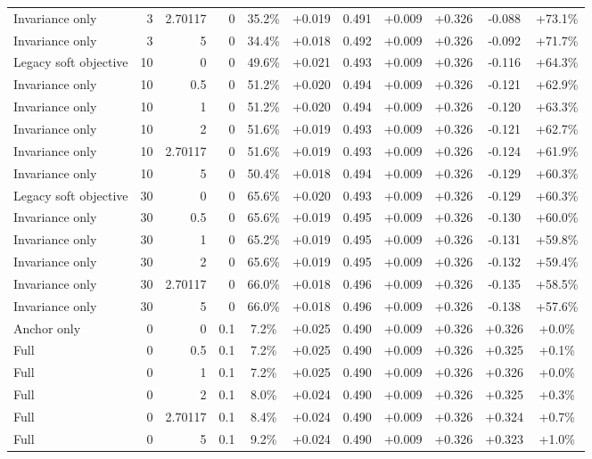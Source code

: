 \begin{table}[htbp]
\begin{tabular}{lrrrccccccc}
Invariance only & 3 & 2.70117 & 0 & 35.2\% & +0.019 & 0.491 & +0.009 & +0.326 & -0.088 & +73.1\% \\
Invariance only & 3 & 5 & 0 & 34.4\% & +0.018 & 0.492 & +0.009 & +0.326 & -0.092 & +71.7\% \\
Legacy soft objective & 10 & 0 & 0 & 49.6\% & +0.021 & 0.493 & +0.009 & +0.326 & -0.116 & +64.3\% \\
Invariance only & 10 & 0.5 & 0 & 51.2\% & +0.020 & 0.494 & +0.009 & +0.326 & -0.121 & +62.9\% \\
Invariance only & 10 & 1 & 0 & 51.2\% & +0.020 & 0.494 & +0.009 & +0.326 & -0.120 & +63.3\% \\
Invariance only & 10 & 2 & 0 & 51.6\% & +0.019 & 0.493 & +0.009 & +0.326 & -0.121 & +62.7\% \\
Invariance only & 10 & 2.70117 & 0 & 51.6\% & +0.019 & 0.493 & +0.009 & +0.326 & -0.124 & +61.9\% \\
Invariance only & 10 & 5 & 0 & 50.4\% & +0.018 & 0.494 & +0.009 & +0.326 & -0.129 & +60.3\% \\
Legacy soft objective & 30 & 0 & 0 & 65.6\% & +0.020 & 0.493 & +0.009 & +0.326 & -0.129 & +60.3\% \\
Invariance only & 30 & 0.5 & 0 & 65.6\% & +0.019 & 0.495 & +0.009 & +0.326 & -0.130 & +60.0\% \\
Invariance only & 30 & 1 & 0 & 65.2\% & +0.019 & 0.495 & +0.009 & +0.326 & -0.131 & +59.8\% \\
Invariance only & 30 & 2 & 0 & 65.6\% & +0.019 & 0.495 & +0.009 & +0.326 & -0.132 & +59.4\% \\
Invariance only & 30 & 2.70117 & 0 & 66.0\% & +0.018 & 0.496 & +0.009 & +0.326 & -0.135 & +58.5\% \\
Invariance only & 30 & 5 & 0 & 66.0\% & +0.018 & 0.496 & +0.009 & +0.326 & -0.138 & +57.6\% \\
Anchor only & 0 & 0 & 0.1 & 7.2\% & +0.025 & 0.490 & +0.009 & +0.326 & +0.326 & +0.0\% \\
Full & 0 & 0.5 & 0.1 & 7.2\% & +0.025 & 0.490 & +0.009 & +0.326 & +0.325 & +0.1\% \\
Full & 0 & 1 & 0.1 & 7.2\% & +0.025 & 0.490 & +0.009 & +0.326 & +0.326 & +0.0\% \\
Full & 0 & 2 & 0.1 & 8.0\% & +0.024 & 0.490 & +0.009 & +0.326 & +0.325 & +0.3\% \\
Full & 0 & 2.70117 & 0.1 & 8.4\% & +0.024 & 0.490 & +0.009 & +0.326 & +0.324 & +0.7\% \\
Full & 0 & 5 & 0.1 & 9.2\% & +0.024 & 0.490 & +0.009 & +0.326 & +0.323 & +1.0\% \\

\end{tabular}
\end{table}
